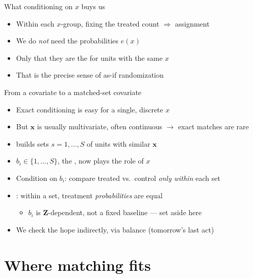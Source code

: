 \documentclass[table, xcolor = {dvipsnames}, 9pt]{beamer}
\theoremstyle{plain}
\newcommand{\mh}[1]{{\color{magenta}{#1}}}
\begin{document}
\begin{frame}[t]{What conditioning on $x$ buys us}
\vfill
\begin{itemize} \vfill
\item Within each $x$-group, fixing the treated count $\Rightarrow$ \mh{uniform} assignment \vfill
\item We do \emph{not} need the probabilities $e(x)$ \vfill
\item Only that they are the \mh{same} for units with the same $x$ \vfill
\item That \mh{assumption} is the precise sense of as-if randomization \vfill
\end{itemize} \vfill
\end{frame}
\begin{frame}[t]{From a covariate to a matched-set covariate}
\vfill
\begin{itemize} \vfill
\item Exact conditioning is easy for a single, discrete $x$ \vfill
\item But $\bm{x}$ is usually multivariate, often continuous $\to$ exact matches are rare \vfill
\item \mh{Matching} builds sets $s = 1, \dots, S$ of units with similar $\bm{x}$ \vfill
\item $b_i \in \{1, \dots, S\}$, the \mh{matched-set label}, now plays the role of $x$ \vfill
\item Condition on $b_i$: compare treated vs.\ control \emph{only within} each set \vfill
\item \mh{Hope}: within a set, treatment \emph{probabilities} are equal \vfill
\begin{itemize} \vfill
\item[$\ast$] $b_i$ is $\bm{Z}$-dependent, not a fixed baseline --- set aside here \\ \citep{pashleyetal2021,pimentelhuang2024,pimentelyu2024} \vfill
\end{itemize} \vfill
\item We check the hope indirectly, via balance (tomorrow's last act) \vfill
\end{itemize} \vfill
\end{frame}
\section{Where matching fits}
\end{document}
